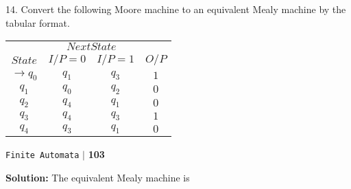 \documentclass{article}
\begin{document}
\vspace*{0.3cm}
14. Convert the following Moore machine to an equivalent Mealy machine by the tabular format.\\

\vspace*{0.2cm}
\begin{center}
\begin{tabular}{cccc}
 \hline

 \hline

 \hline

 \hline
 & \multicolumn{2}{c}{$Next State$ }\\
 \cline{2-3}
 $State$ &  $I/P=0$ & $I/P=1$  &  $O/P$\\
\hline
$\rightarrow q_0$  &    $q_1$   &  $q_3$   &  $1$ \\
$q_1$              &    $q_0$   &  $q_2$   &  $0$ \\
$q_2$              &    $q_4$   &  $q_1$   &  $0$ \\
$q_3$              &    $q_4$   &  $q_3$   &  $1$ \\
$q_4$              &    $q_3$   &  $q_1$   &  $0$ \\
 \hline

 \hline

 \hline

 \hline
\end{tabular}
\end{center}

\newpage

\begin{flushright}
 \texttt{Finite Automata} \hspace*{0.1cm}\textbf{$|$} \hspace*{0.1cm} \textbf{103}\hspace*{0.1cm}
\end{flushright}
\vspace*{0.5cm}

\textbf{Solution:} The equivalent Mealy machine is\\
\end{document}
